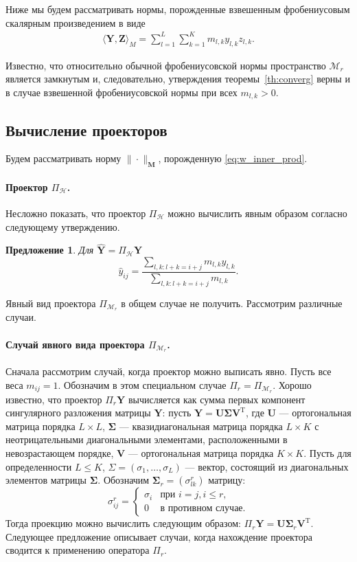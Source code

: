 \documentclass[12pt,a4paper,fleqn,leqno]{article}
\newtheorem{proposition}{Предложение}
\newcommand{\rmT}{\mathrm{T}}
\newcommand{\bfM}{\mathbf{M}}
\newcommand{\bfU}{\mathbf{U}}
\newcommand{\bfV}{\mathbf{V}}
\newcommand{\bfY}{\mathbf{Y}}
\newcommand{\bfZ}{\mathbf{Z}}
\newcommand{\calH}{\mathcal{H}}
\newcommand{\calM}{\mathcal{M}}
\newcommand{\be}{\begin{eqnarray}}
\newcommand{\ee}{\end{eqnarray}}
\begin{document}
Ниже мы будем рассматривать нормы, порожденные взвешенным фробениусовым скалярным произведением в виде
\be
\label{eq:w_inner_prod}
\langle\bfY, \bfZ\rangle_M = \sum_{l = 1}^L \sum_{k = 1}^K m_{l, k} y_{l, k} z_{l, k}.
\ee

Известно, что относительно обычной фробениусовской нормы пространство $\calM_r$ является замкнутым и, следовательно, утверждения теоремы~\ref{th:converg} верны и в случае взвешенной фробениусовской нормы при всех $m_{l,k} > 0$.


\subsection{Вычисление проекторов}

Будем рассматривать норму $\|\cdot\|_\bfM$, порожденную \eqref{eq:w_inner_prod}.

\paragraph{Проектор $\Pi_\calH$.} Несложно показать, что проектор $\Pi_\calH$
можно вычислить явным образом согласно следующему утверждению.

\begin{proposition}
Для $\widehat{\bfY}=\Pi_\calH \bfY$
\begin{equation*}
\hat{y}_{ij} = \frac{\sum_{l,k: l+k=i+j} m_{l,k} y_{l,k}}{\sum_{l,k: l+k=i+j} m_{l,k}}.
\end{equation*}
\end{proposition}

Явный вид проектора $\Pi_{\calM_r}$ в общем случае не получить.
Рассмотрим различные случаи.

\paragraph{Случай явного вида проектора $\Pi_{\calM_r}$.} Сначала рассмотрим случай, когда проектор можно выписать явно.
Пусть все веса $m_{ij}=1$. Обозначим в этом специальном случае $\Pi_r=\Pi_{\calM_r}$.
Хорошо известно, что проектор $\Pi_{r} \bfY$
вычисляется как сумма первых компонент сингулярного разложения матрицы $\bfY$: пусть $\bfY = \bfU \mathbf{\Sigma} \bfV^\rmT$, где $\bfU$ --- ортогональная матрица порядка $L \times L$, $\mathbf{\Sigma}$ --- квазидиагональная матрица порядка $L \times K$ с неотрицательными диагональными элементами, расположенными в невозрастающем порядке, $\bfV$ --- ортогональная матрица порядка $K \times K$. Пусть для определенности $L\le K$, $\Sigma = (\sigma_1, \ldots, \sigma_L)$ --- вектор, состоящий из диагональных элементов матрицы $\mathbf{\Sigma}$. Обозначим $\mathbf{\Sigma}_r = (\sigma^r_{l k})$ матрицу:
\begin{equation*}
\sigma^r_{i j} = \begin{cases}
\sigma_i & \text{при $i = j, i \le r,$}\\
0 & \text{в противном случае}.
\end{cases}
\end{equation*}
Тогда проекцию можно вычислить следующим образом: $\Pi_{r} \bfY  = \bfU \mathbf{\Sigma}_r \bfV^\rmT$.
Следующее предложение описывает случаи, когда нахождение проектора
сводится к применению оператора $\Pi_r$.
\end{document}
